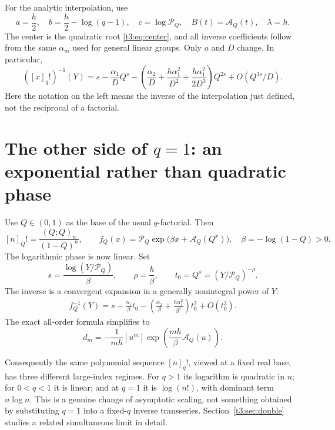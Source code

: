 \documentclass[11pt,openany]{book}
\numberwithin{equation}{chapter}
\theoremstyle{plain}
\theoremstyle{definition}
\theoremstyle{remark}
\newcommand{\coefB}[2]{[#1^{#2}]}             %
\newcommand{\pp}[1]{(Q;Q)_{#1}}
\newcommand{\Pinf}{\mathcal P_Q}
\newcommand{\A}{\mathcal A_Q}
\begin{document}
For the analytic interpolation, use
\begin{equation}\label{t3:eq:flagphase}
 a=\frac h2,\quad b=\frac h2-\log(q-1),\quad
 c=\log\Pinf,\quad B(t)=\A(t),\quad\lambda=h.
\end{equation}
The center is the quadratic root \eqref{t3:eq:center}, and all inverse coefficients follow from the same $\alpha_m$ used for general linear groups. Only $a$ and $D$ change. In particular,
\begin{equation}\label{t3:eq:flaginverse}
 ([x]_q!)^{-1}(Y)
 =s-\frac{\alpha_1}{D}Q^s
 -\left(\frac{\alpha_2}{D}
   +\frac{h\alpha_1^2}{D^2}
   +\frac{h\alpha_1^2}{2D^3}\right)Q^{2s}
 +O(Q^{3s}/D).
\end{equation}
Here the notation on the left means the inverse of the interpolation just defined, not the reciprocal of a factorial.

\section{The other side of \texorpdfstring{$q=1$}{q = 1}: an exponential rather than quadratic phase}
\label{t3:sec:qfactorial-smallbase}

Use $Q\in(0,1)$ as the base of the usual $q$-factorial. Then
\begin{equation}\label{t3:eq:smallbase-factorial}
 [n]_Q!=\frac{\pp{n}}{(1-Q)^n},\qquad
 f_Q(x)=\Pinf\exp\bigl(\beta x+\A(Q^x)\bigr),
 \quad \beta=-\log(1-Q)>0.
\end{equation}
The logarithmic phase is now linear. Set
\begin{equation}\label{t3:eq:smallbase-center}
 s=\frac{\log(Y/\Pinf)}\beta,\qquad
 \rho=\frac h\beta,\qquad
 t_0=Q^s=(Y/\Pinf)^{-\rho}.
\end{equation}
The inverse is a convergent expansion in a generally nonintegral power of $Y$:
\begin{align}\label{t3:eq:smallbase-inverse}
 f_Q^{-1}(Y)=s
 -\frac{\alpha_1}{\beta}t_0
 -\left(\frac{\alpha_2}{\beta}
       +\frac{h\alpha_1^2}{\beta^2}\right)t_0^2
 +O(t_0^3).
\end{align}
The exact all-order formula simplifies to
\begin{equation}\label{t3:eq:linear-extraction}
 d_m=-\frac1{mh}\coefB{u}{m}\exp\left(\frac{mh}{\beta}\A(u)\right).
\end{equation}

Consequently the same polynomial sequence $[n]_q!$, viewed at a fixed real base, has three different large-index regimes. For $q>1$ its logarithm is quadratic in $n$; for $0<q<1$ it is linear; and at $q=1$ it is $\log(n!)$, with dominant term $n\log n$. This is a genuine change of asymptotic scaling, not something obtained by substituting $q=1$ into a fixed-$q$ inverse transseries. Section~\ref{t3:sec:double} studies a related simultaneous limit in detail.
\end{document}
